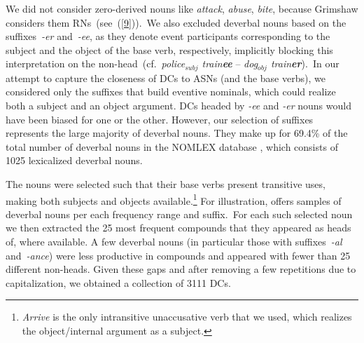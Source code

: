 \documentclass[output=paper]{langsci/langscibook}
\begin{document}
We  {did not} consider zero-derived nouns like \textit{attack}, \textit{abuse}, \textit{bite}, because Grimshaw considers them RNs~(see\ (\ref{9})).\ 
We also excluded deverbal nouns based on the suffixes~\mbox{\textit{-er}} and~\mbox{\textit{-ee}}, as they denote event participants corresponding to the subject and the object of the base verb, respectively, implicitly blocking this interpretation on the non-head~(cf.\ \textit{police$_{subj}$ train\textbf{ee}} -- \textit{dog$_{obj}$ train\textbf{er}}).\ In our attempt to capture the closeness of DCs to ASNs (and the base verbs), we considered only the suffixes that build eventive nominals, which could realize both a subject and an object argument. DCs headed by \textit{-ee} and \textit{-er} nouns would have been biased for one or the other. However, our selection of suffixes represents the large majority of deverbal nouns. They make up for 69.4\% of the total number of deverbal nouns in the NOMLEX database \citep{NOMLEX:98}, which consists of 1025 lexicalized deverbal nouns.


The nouns were selected such that their base verbs present transitive uses, making both subjects and objects available.\footnote{\textit{Arrive} is the only intransitive unaccusative verb that we used, which realizes the object/internal argument as a subject.} For illustration,  offers  samples of deverbal nouns per each frequency range and suffix.\ For each such selected noun we then extracted the 25 most frequent compounds that they appeared as heads of, where available. A few deverbal nouns (in particular those with suffixes~\mbox{\textit{-al}} and~\mbox{\textit{-ance}}) were less productive in compounds and appeared with fewer than 25 different non-heads. Given these gaps and after removing a few repetitions due to capitalization, we obtained a collection of 3111 DCs.
\end{document}
